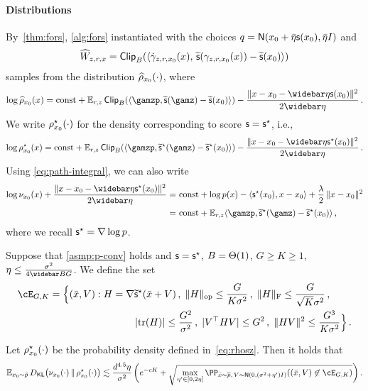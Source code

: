 \paragraph{Distributions}
By~\cref{thm:fors}, \cref{alg:fors} instantiated with the choices $q = \normal{x_0+\bar\eta\scf(x_0),\bar\eta I}$ and
\begin{align}\label{eq:def-DM-path-What}
    \widehat W_{z,r,x} = \mathsf{Clip}_{B}(\langle \dot\gamma_{z,r,x_0}(x),\, \widetilde{\mathsf{s}}(\gamma_{z,r,x_0}(x)) - \widetilde{\mathsf{s}}(x_0)\rangle)
\end{align}
samples from the distribution $\widehat{\rho}_{x_0}(\cdot)$, where
\begin{align}\label{eq:rhohz}
    \log \rhohz{x}=\const+\En_{\lr,z}\pclip[\B]{\tri{\gamzp,\tscf(\gamz)-\tscf(\xz)}}-\frac{\nrm{x-\xz-\etabar\scf(\xz)}^2}{2\etabar}\,.
\end{align}
We write $\rho^\star_{x_0}(\cdot)$ for the density corresponding to score $\mathsf{s}=\mathsf{s}^\star$, i.e.,
\begin{align}\label{eq:rhosz}
    \log \rhosz{x}=\const+\En_{\lr,z}\pclip[\B]{\tri{\gamzp,\tscfs(\gamz)-\tscfs(\xz)}}-\frac{\nrm{x-\xz-\etabar\scfs(\xz)}^2}{2\etabar}\,.
\end{align}
Using \cref{eq:path-integral}, we can also write
\begin{align*}
    \log \piz{x}+\frac{\nrm{x-\xz-\etabar\scfs(\xz)}^2}{2\etabar}
    =&~\const+ \log p(x)-\tri{\scfs(\xz),x-\xz}+\frac{\lambda}{2}\,\nrm{x-\xz}^2 \\
    =&~ \const+\En_{\lr,z}\tri{\gamzp,\tscfs(\gamz)-\tscfs(\xz)}\,,
\end{align*}
where we recall $\mathsf{s}^\star=\nabla \log p$.







\begin{proposition}\label{prop:DM-path-scfs}
Suppose that \cref{asmp:p-conv} holds and $\mathsf{s}=\mathsf{s}^\star$, $B=\Theta(1)$, $G\geq K\geq 1$, $\eta\leq \frac{\sigma^2}{4\Bbar G}$.
We define the set
\begin{align*}
    \cE_{G,K}=\Big\{ (\xbar,V)&: H=\nabla \tscfs(\xbar+V)\,, \;
    \nrmop{H}\leq \frac{G}{K\sigma^2}\,,\; 
    \nrmF{H} \leq \frac{G}{\sqrt{K}\sigma^2}\,, \\
    &\qquad\qquad \abs{\tr(H)}\leq \frac{G^2}{\sigma^2}\,,\; \abs{V\tp HV}\leq G^2\,,\; \nrm{HV}^2\leq \frac{G^3}{K\sigma^2} \Big\}\,.
\end{align*}

Let $\rho^\star_{x_0}(\cdot)$ be the probability density defined in~\eqref{eq:rhosz}. Then it holds that
\begin{align*}
\En_{\xz\sim \breve p} \Dkl{\piz{\cdot}}{\rhosz{\cdot}}
\leqsim \frac{d^{4.5}\eta}{\sigma^2}\, \prn[\bigg]{ e^{-cK}+\sqrt{\max_{\eta'\in[0,2\eta]}\PP_{\xbar\sim \pbar,\, V\sim \normal{0,(\sigma^2+\eta')\Id}}\prn*{(\xbar,V)\not\in \cE_{G,K}}}}\,.
\end{align*}
\end{proposition}

